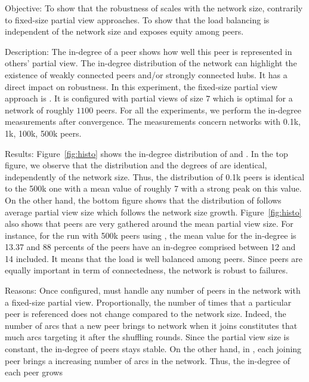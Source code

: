 \begin{asparadesc}
\item[Objective:] To show that the robustness of \SPRAY scales with the network
  size, contrarily to fixed-size partial view approaches. To show that the load
  balancing is independent of the network size and exposes equity among peers.
\item[Description:] The in-degree of a peer shows how well this peer is
  represented in others' partial view. The in-degree distribution of the
  network can highlight the existence of weakly connected peers and/or strongly
  connected hubs. It has a direct impact on robustness. In this experiment, the
  fixed-size partial view approach is \CYCLON{}. It is configured with partial
  views of size $7$ which is optimal for a network of roughly $1100$ peers.
  For all the experiments, we perform the in-degree measurements after
  convergence. The measurements concern networks with 0.1k, 1k, 100k, 500k
  peers.
\item[Results:] Figure~\ref{fig:histo} shows the in-degree distribution of
  \CYCLON and \SPRAY. In the top figure, we observe that the distribution and
  the degrees of \CYCLON are identical, independently of the network
  size. Thus, the distribution of 0.1k peers is identical to the 500k one with
  a mean value of roughly 7 with a strong peak on this value. On the other
  hand, the bottom figure shows that the distribution of \SPRAY follows average
  partial view size which follows the network size
  growth. Figure~\ref{fig:histo} also shows that peers are very gathered around
  the mean partial view size. For instance, for the run with 500k peers using
  \SPRAY, the mean value for the in-degree is 13.37 and 88 percents of the
  peers have an in-degree comprised between 12 and 14 included. It means that
  the load is well balanced among peers. Since peers are equally important in
  term of connectedness, the network is robust to failures.
\item[Reasons:] Once configured, \CYCLON must handle any number of peers in the
  network with a fixed-size partial view. Proportionally, the number of times
  that a particular peer is referenced does not change compared to the network
  size. Indeed, the number of arcs that a new peer brings to network when it
  joins constitutes that much arcs targeting it after the shuffling
  rounds. Since the partial view size is constant, the in-degree of peers stays
  stable. On the other hand, in \SPRAY, each joining peer brings a increasing
  number of arcs in the network. Thus, the in-degree of each peer grows

\end{asparadesc}
